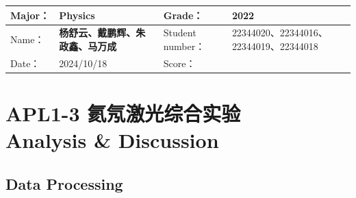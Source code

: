 
\begin{table}
	\renewcommand\arraystretch{1.7}
	\begin{tabularx}{\textwidth}{|X|X|X|X|}
		\hline
		Major：& Physics &Grade：& 2022\\
		\hline
		Name： & \textbf{杨舒云、戴鹏辉、朱政鑫、马万成} & Student number：& 22344020、22344016、22344019、22344018\\
		\hline
		Date：& 2024/10/18 & Score： &\\
		\hline
	\end{tabularx}
\end{table}
\section{APL1-3 氦氖激光综合实验 \\ Analysis \& Discussion}


\subsection{Data Processing}

